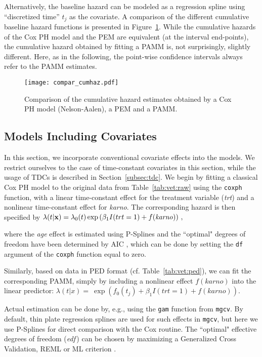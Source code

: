 \documentclass[submit]{smj}
\newcommand{\bfx}{\mathbf{x}}
\begin{document}
Alternatively, the baseline hazard can be modeled as a regression spline using
``discretized time'' $t_j$ as the covariate.
A comparison of the different cumulative baseline hazard functions is presented in Figure~\ref{fig:comp:haz}.
While the cumulative hazards of the Cox PH model and the PEM are equivalent (at the interval end-points),
the cumulative hazard obtained by fitting a PAMM is, not surprisingly, slightly different.
Here, as in the following, the point-wise confidence intervals always refer to
the PAMM estimates.


\begin{figure}[!h]
\texttt{[image: compar\_cumhaz.pdf]}
\vspace{-40pt}
\caption{Comparison of the cumulative hazard estimates obtained by a Cox PH model
(Nelson-Aalen), a PEM and a PAMM.}
\label{fig:comp:haz}
\end{figure}


\subsection{Models Including Covariates}\label{ssec:withCovars}
In this section, we incorporate conventional covariate effects into the models.
We restrict ourselves to the case of time-constant covariates in this section,
while the usage of TDCs is described in Section~\ref{subsec:tdc}.
We begin by fitting a classical Cox PH model to the original data from
Table~\ref{tab:vet:raw} using the \texttt{coxph} function, with a linear
time-constant effect for the treatment variable ({\it trt}) and a nonlinear
time-constant effect for {\it karno}. The corresponding hazard is then specified
by
$
\lambda(t|\bfx) = \lambda_0(t)\exp \left(\beta_1I(trt=1) + f(\text{\emph{karno}})\right)\,,
$

where the {\it age} effect is estimated using P-Splines \citep{Eilers1996} and
the ``optimal" degrees of freedom have been determined by AIC \citep{HurSimTsa:98},
which can be done by setting the \texttt{df} argument of the \texttt{coxph}
function equal to zero.

Similarly, based on data in PED format (cf.  Table~\ref{tab:vet:ped}), we can
fit the corresponding PAMM, simply by including a nonlinear effect
$f(karno)$ into the linear predictor:
$
\lambda(t|x)=~\exp(f_{0}(t_j) + \beta_1I(trt=1) + f(karno)).
$

Actual estimation can be done by, e.g., using the \texttt{gam} function from
\texttt{mgcv}. By default, thin plate regression splines are used for such
effects in \texttt{mgcv}, but here we use P-Splines for direct comparison with
the Cox routine. The ``optimal" effective degrees of freedom
({\it edf}\,) can be chosen by maximizing a Generalized Cross Validation, REML
or ML criterion \citep{Wood2017,Wood:2011}.
\end{document}
